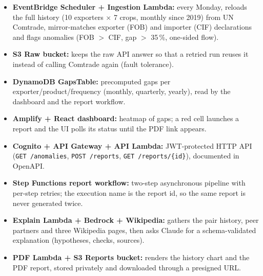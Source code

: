 \documentclass[10pt,a4paper]{article}
\newcommand{\cmp}[1]{\textbf{#1}}
\begin{document}
\vspace{-2pt}
\begin{itemize}
  \item \cmp{EventBridge Scheduler + Ingestion Lambda:} every Monday, reloads the full history (10 exporters $\times$ 7 crops, monthly since 2019) from UN Comtrade, mirror-matches exporter (FOB) and importer (CIF) declarations and flags anomalies (FOB $>$ CIF, gap $>$ 35\,\%, one-sided flow).
  \item \cmp{S3 Raw bucket:} keeps the raw API answer so that a retried run reuses it instead of calling Comtrade again (fault tolerance).
  \item \cmp{DynamoDB GapsTable:} precomputed gaps per exporter/product/frequency (monthly, quarterly, yearly), read by the dashboard and the report workflow.
  \item \cmp{Amplify + React dashboard:} heatmap of gaps; a red cell launches a report and the UI polls its status until the PDF link appears.
  \item \cmp{Cognito + API Gateway + API Lambda:} JWT-protected HTTP API (\texttt{GET /anomalies}, \texttt{POST /reports}, \texttt{GET /reports/\{id\}}), documented in OpenAPI.
  \item \cmp{Step Functions report workflow:} two-step asynchronous pipeline with per-step retries; the execution name is the report id, so the same report is never generated twice.
  \item \cmp{Explain Lambda + Bedrock + Wikipedia:} gathers the pair history, peer partners and three Wikipedia pages, then asks Claude for a schema-validated explanation (hypotheses, checks, sources).
  \item \cmp{PDF Lambda + S3 Reports bucket:} renders the history chart and the PDF report, stored privately and downloaded through a presigned URL.
\end{itemize}

\end{document}

